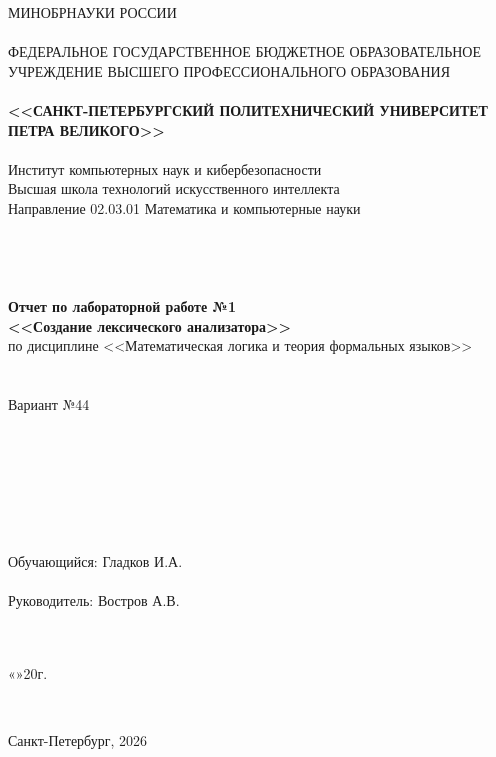 \documentclass[10pt,a4paper,final]{article} %
\begin{document}
\thispagestyle{empty}

\begin{center}
	{\Large МИНОБРНАУКИ РОССИИ}\\
	~\\
	{\large ФЕДЕРАЛЬНОЕ ГОСУДАРСТВЕННОЕ БЮДЖЕТНОЕ ОБРАЗОВАТЕЛЬНОЕ УЧРЕЖДЕНИЕ ВЫСШЕГО ПРОФЕССИОНАЛЬНОГО ОБРАЗОВАНИЯ}\\
	~\\
	{\Large \bf <<САНКТ-ПЕТЕРБУРГСКИЙ ПОЛИТЕХНИЧЕСКИЙ УНИВЕРСИТЕТ ПЕТРА ВЕЛИКОГО>>}\\
	~\\
	{\large Институт компьютерных наук и кибербезопасности}\\
	{\large Высшая школа технологий искусственного интеллекта}\\
	{\large Направление 02.03.01 Математика и компьютерные науки}\\
	~\\
	~\\
	~\\
	~\\
	{\Large \bf Отчет по лабораторной работе №1}\\
		{\Large \bf <<Создание лексического анализатора>>}\\
	{\Large по дисциплине <<Математическая логика и теория формальных языков>> }\\
	~\\
	~\\

	{\Large Вариант №44}\\

	~\\
	~\\
	~\\
	~\\
	~\\
	~\\
	~\\
	{\large Обучающийся: \underline{\hspace{3.5cm}} \qquad\qquad Гладков И.А.}\\
	~\\
	{\large Руководитель: \underline{\hspace{3.5cm}} \hspace{20mm} Востров А.В.}\\
	~\\
	~\\
\end{center}
\begin{flushright}

	«\underline{\hspace{1cm}}»\underline{\hspace{3cm}}20\underline{\hspace{0.7cm}}г.
\end{flushright}
~\\
\begin{center}
	{\large Санкт-Петербург, 2026}
\end{center}
\newpage
\end{document}
